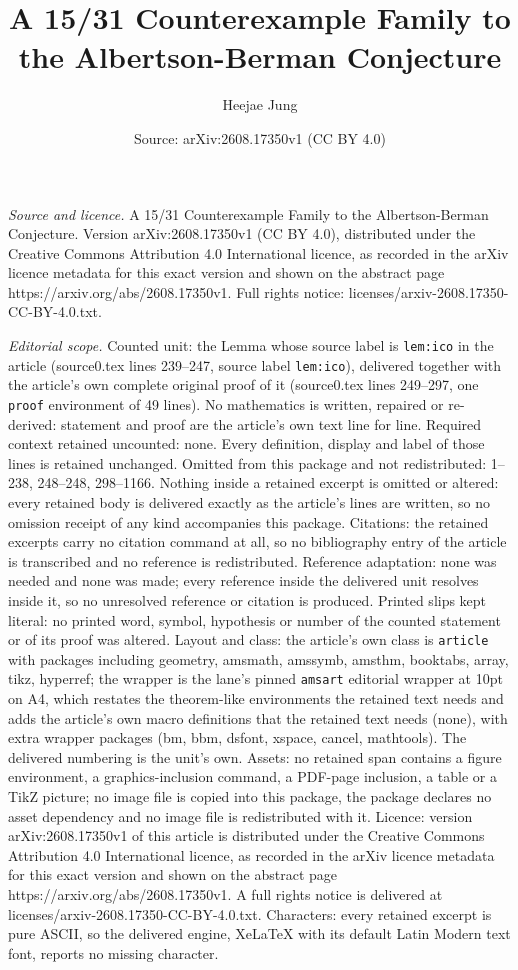 \documentclass[10pt,a4paper]{amsart}
\title[A 15/31 Counterexample Family to the Albertson-Berman Conjec]{A 15/31 Counterexample Family to the Albertson-Berman Conjecture}
\author{Heejae Jung}
\date{Source: arXiv:2608.17350v1 (CC BY 4.0)}
\begin{document}
\maketitle

\noindent\emph{Source and licence.} A 15/31 Counterexample Family to the Albertson-Berman Conjecture. Version arXiv:2608.17350v1 (CC BY 4.0), distributed under the Creative Commons Attribution 4.0 International licence, as recorded in the arXiv licence metadata for this exact version and shown on the abstract page https://arxiv.org/abs/2608.17350v1. Full rights notice: licenses/arxiv-2608.17350-CC-BY-4.0.txt.\par\smallskip

\noindent\textit{Editorial scope.} Counted unit: the Lemma whose source label is \texttt{lem:ico} in the article (source0.tex lines 239--247, source label \texttt{lem:ico}), delivered together with the article's own complete original proof of it (source0.tex lines 249--297, one \texttt{proof} environment of 49 lines). No mathematics is written, repaired or re-derived: statement and proof are the article's own text line for line. Required context retained uncounted: none. Every definition, display and label of those lines is retained unchanged. Omitted from this package and not redistributed: 1--238, 248--248, 298--1166. Nothing inside a retained excerpt is omitted or altered: every retained body is delivered exactly as the article's lines are written, so no omission receipt of any kind accompanies this package. Citations: the retained excerpts carry no citation command at all, so no bibliography entry of the article is transcribed and no reference is redistributed. Reference adaptation: none was needed and none was made; every reference inside the delivered unit resolves inside it, so no unresolved reference or citation is produced. Printed slips kept literal: no printed word, symbol, hypothesis or number of the counted statement or of its proof was altered. Layout and class: the article's own class is \texttt{article} with packages including geometry, amsmath, amssymb, amsthm, booktabs, array, tikz, hyperref; the wrapper is the lane's pinned \texttt{amsart} editorial wrapper at 10pt on A4, which restates the theorem-like environments the retained text needs and adds the article's own macro definitions that the retained text needs (none), with extra wrapper packages (bm, bbm, dsfont, xspace, cancel, mathtools). The delivered numbering is the unit's own. Assets: no retained span contains a figure environment, a graphics-inclusion command, a PDF-page inclusion, a table or a TikZ picture; no image file is copied into this package, the package declares no asset dependency and no image file is redistributed with it. Licence: version arXiv:2608.17350v1 of this article is distributed under the Creative Commons Attribution 4.0 International licence, as recorded in the arXiv licence metadata for this exact version and shown on the abstract page https://arxiv.org/abs/2608.17350v1. A full rights notice is delivered at licenses/arxiv-2608.17350-CC-BY-4.0.txt. Characters: every retained excerpt is pure ASCII, so the delivered engine, XeLaTeX with its default Latin Modern text font, reports no missing character.
\end{document}
